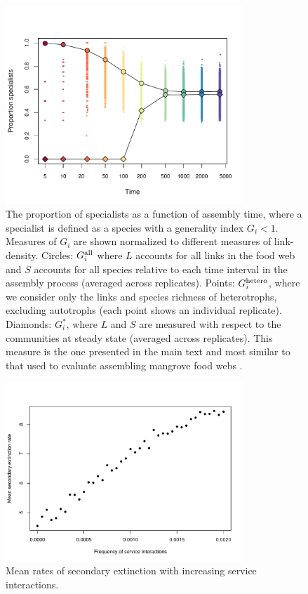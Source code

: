 \documentclass[twocolumn,preprintnumbers,amsmath,amssymb,superscriptaddress,linenumbers]{revtex4-1}
\newcommand{\rr}[1]{{\rm #1}}
\begin{document}
\begin{figure}[h!]
\centering
\includegraphics[width=0.8\textwidth]{fig_specialization.pdf}
\caption{
The proportion of specialists as a function of assembly time, where a specialist is defined as a species with a generality index $G_i < 1$.
Measures of $G_i$ are shown normalized to different measures of link-density.
Circles: $G_i^{\rr{all}}$ where $L$ accounts for all links in the food web and $S$ accounts for all species relative to each time interval in the assembly process (averaged across replicates).
Points: $G_i^{\rr{hetero}}$, where we consider only the links and species richness of heterotrophs, excluding autotrophs (each point shows an individual replicate).
Diamonds: $G_i^*$, where $L$ and $S$ are measured with respect to the communities at steady state (averaged across replicates). 
This measure is the one presented in the main text and most similar to that used to evaluate assembling mangrove food webs \cite{Piechnik2008}.
}
\label{fig:spec}
\end{figure}



\begin{figure}[h!]
\centering
\includegraphics[width=0.8\textwidth]{fig_mutsecext.pdf}
\caption{
Mean rates of secondary extinction with increasing service interactions.
}
\label{fig:mutsecext}
\end{figure}
\end{document}
